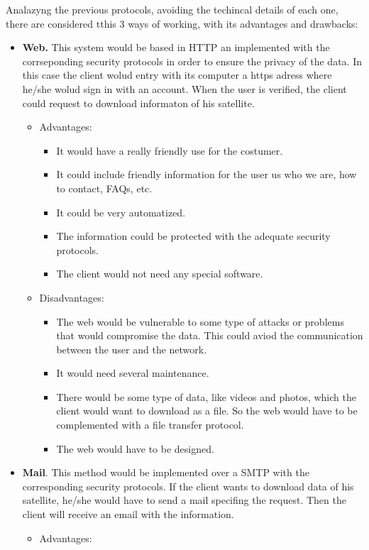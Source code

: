 Analazyng the previous protocols, avoiding the techincal details of each one, there are considered tthis 3 ways of working, with its advantages and drawbacks:
\begin{itemize}
\item \textbf{Web.} This system would be based in HTTP an implemented with the corrseponding security protocols in order to ensure the privacy of the data. In this case the client wolud entry with its computer a https adress where he/she wolud sign in with an account. When the user is verified, the client could request to download informaton of his satellite. 
\begin{itemize}
\item Advantages: 
\begin{itemize}
\item It would have a really friendly use for the costumer.
\item It could include friendly information for the user us who we are, how to contact, FAQs, etc.
\item It could be very automatized.
\item The information could be protected with the adequate security protocols.
\item The client would not need any special software.
\end{itemize}
\item Disadvantages:
\begin{itemize}
\item The web would be vulnerable to some type of attacks or problems that would compromise the data. This could aviod the communication between the user and the network.
\item It would need several maintenance.
\item There would be some type of data, like videos and photos, which the client would want to download as a file. So the web would have to be complemented with a file transfer protocol.
\item The web would have to be designed.
\end{itemize}
\end{itemize}
\item \textbf{Mail}. This method would be implemented over a SMTP with the corresponding security protocols. If the client wants to download data of his satellite, he/she would have to send a mail specifing the request. Then the client will receive an email with the information.
\begin{itemize}
\item Advantages:

\end{itemize}
\end{itemize}
